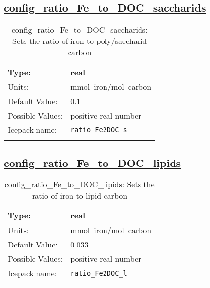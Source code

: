 \subsection[config\_ratio\_Fe\_to\_DOC\_saccharids]{\hyperref[sec:nm_tab_biogeochemistry]{config\_ratio\_Fe\_to\_DOC\_saccharids}}
\label{subsec:nm_sec_config_ratio_Fe_to_DOC_saccharids}
\begin{center}
\begin{longtable}{| p{2.0in} || p{4.0in} |}
    \hline
    Type: & real \\
    \hline
    Units: & \si{mmol.iron/mol.carbon} \\
    \hline
    Default Value: & 0.1 \\
    \hline
    Possible Values: & positive real number \\
    \hline
    Icepack name: & \verb+ratio_Fe2DOC_s+ \\
    \hline
    \caption{config\_ratio\_Fe\_to\_DOC\_saccharids: Sets the ratio of iron to poly/saccharid carbon}
\end{longtable}
\end{center}
\subsection[config\_ratio\_Fe\_to\_DOC\_lipids]{\hyperref[sec:nm_tab_biogeochemistry]{config\_ratio\_Fe\_to\_DOC\_lipids}}
\label{subsec:nm_sec_config_ratio_Fe_to_DOC_lipids}
\begin{center}
\begin{longtable}{| p{2.0in} || p{4.0in} |}
    \hline
    Type: & real \\
    \hline
    Units: & \si{mmol.iron/mol.carbon} \\
    \hline
    Default Value: & 0.033 \\
    \hline
    Possible Values: & positive real number \\
    \hline
    Icepack name: & \verb+ratio_Fe2DOC_l+ \\
    \hline
    \caption{config\_ratio\_Fe\_to\_DOC\_lipids: Sets the ratio of iron to lipid carbon}
\end{longtable}
\end{center}
